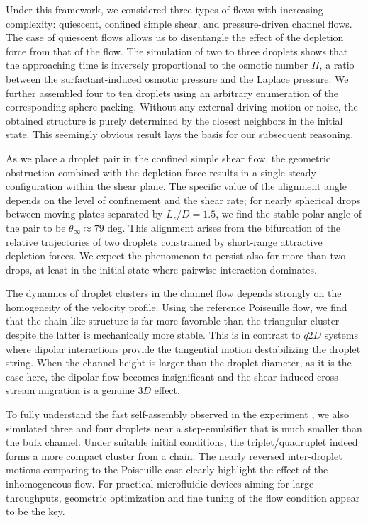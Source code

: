 Under this framework, we considered three types of flows with increasing complexity: quiescent, confined simple shear, and pressure-driven channel flows. The case of quiescent flows allows us to disentangle the effect of the depletion force from that of the flow. The simulation of two to three droplets shows that the approaching time is inversely proportional to the osmotic number $\Pi$, a ratio between the surfactant-induced osmotic pressure and the Laplace pressure. We further assembled four to ten droplets using an arbitrary enumeration of the corresponding sphere packing. Without any external driving motion or noise, the obtained structure is purely determined by the closest neighbors in the initial state. This seemingly obvious result lays the basis for our subsequent reasoning.

As we place a droplet pair in the confined simple shear flow, the geometric obstruction combined with the depletion force results in a single steady configuration within the shear plane. The specific value of the alignment angle depends on the level of confinement and the shear rate; for nearly spherical drops between moving plates separated by $L_z/D =1.5$, we find the stable polar angle of the pair to be $\theta_\infty \approx 79$ deg. This alignment arises from the bifurcation of the relative trajectories of two droplets constrained by short-range attractive depletion forces. We expect the phenomenon to persist also for more than two drops, at least in the initial state where pairwise interaction dominates.

The dynamics of droplet clusters in the channel flow depends strongly on the homogeneity of the velocity profile. Using the reference Poiseuille flow, we find that the chain-like structure is far more favorable than the triangular cluster despite the latter is mechanically more stable. This is in contrast to $q2D$ systems where dipolar interactions provide the tangential motion destabilizing the droplet string. When the channel height is larger than the droplet diameter, as it is the case here, the dipolar flow becomes insignificant and the shear-induced cross-stream migration is a genuine $3D$ effect.

To fully understand the fast self-assembly observed in the experiment \citep{Shen_2016AS}, we also simulated three and four droplets near a step-emulsifier that is much smaller than the bulk channel. Under suitable initial conditions, the triplet/quadruplet indeed forms a more compact cluster from a chain. The nearly reversed inter-droplet motions comparing to the Poiseuille case clearly highlight the effect of the inhomogeneous flow. For practical microfluidic devices aiming for large throughputs, geometric optimization and fine tuning of the flow condition appear to be the key.

